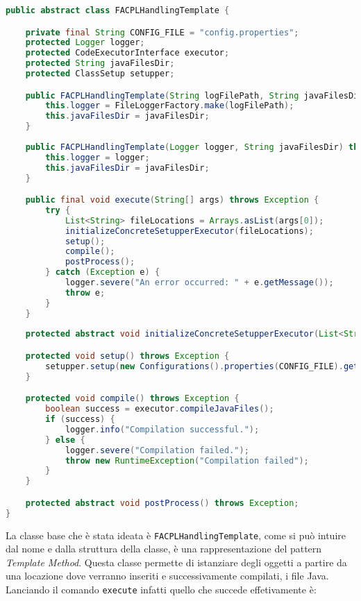 \begin{lstlisting}[language=Java, caption=Classe FACPLHandlingTemplate, label=code:FACPLHandlingTemplate, basicstyle=\fontsize{8.5}{10}\ttfamily]
public abstract class FACPLHandlingTemplate {

	private final String CONFIG_FILE = "config.properties";
    protected Logger logger;
    protected CodeExecutorInterface executor;
    protected String javaFilesDir;
    protected ClassSetup setupper;

    public FACPLHandlingTemplate(String logFilePath, String javaFilesDir) throws IOException {
        this.logger = FileLoggerFactory.make(logFilePath);
        this.javaFilesDir = javaFilesDir;
    }
    
    public FACPLHandlingTemplate(Logger logger, String javaFilesDir) throws IOException {
        this.logger = logger;
        this.javaFilesDir = javaFilesDir;
    }

    public final void execute(String[] args) throws Exception {
        try {
            List<String> fileLocations = Arrays.asList(args[0]);
            initializeConcreteSetupperExecutor(fileLocations);
            setup();
            compile();
            postProcess();
        } catch (Exception e) {
            logger.severe("An error occurred: " + e.getMessage());
            throw e;
        }
    }
    
    protected abstract void initializeConcreteSetupperExecutor(List<String> fileLocations) throws Exception;

    protected void setup() throws Exception {
        setupper.setup(new Configurations().properties(CONFIG_FILE).getString("context.file.location"), javaFilesDir);
    }

    protected void compile() throws Exception {
        boolean success = executor.compileJavaFiles();
        if (success) {
            logger.info("Compilation successful.");
        } else {
            logger.severe("Compilation failed.");
            throw new RuntimeException("Compilation failed");
        }
    }

    protected abstract void postProcess() throws Exception;
}
\end{lstlisting}
La classe base che è stata ideata è \texttt{FACPLHandlingTemplate}, come si può intuire dal nome e dalla struttura della classe, è una rappresentazione del pattern \emph{Template Method}\cite{GOF}. Questa classe permette di istanziare degli oggetti a partire da una locazione dove verranno inseriti e successivamente compilati, i file Java. Lanciando il comando \texttt{execute} infatti quello che succede effetivamente è:
